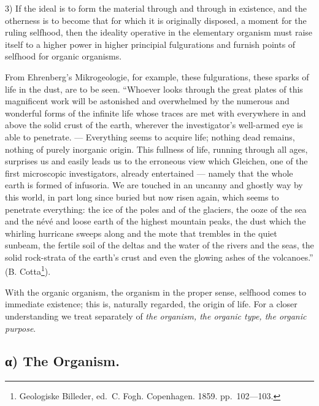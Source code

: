 \documentclass[12pt,a4paper]{book}
\begin{document}
3) If the ideal is to form the material through and through in existence, and
the otherness is to become that for which it is originally disposed, a moment
for the ruling selfhood,
\setcounter{footnote}{0}
then the ideality operative in the elementary organism must raise itself to a
higher power in higher principial fulgurations and furnish points of selfhood
for organic organisms.

From Ehrenberg's Mikrogeologie, for example, these fulgurations, these sparks
of life in the dust, are to be seen. ``Whoever looks through the great plates
of this magnificent work will be astonished and overwhelmed by the numerous and
wonderful forms of the infinite life whose traces are met with everywhere in
and above the solid crust of the earth, wherever the investigator's
well-armed eye is able to penetrate. --- Everything seems to acquire life;
nothing dead remains, nothing of purely inorganic origin. This fullness of
life, running through all ages, surprises us and easily leads us to the
erroneous view which Gleichen, one of the first microscopic investigators,
already entertained --- namely that the whole earth is formed of infusoria. We
are touched in an uncanny and ghostly way by this world, in part long since
buried but now risen again, which seems to penetrate everything: the ice of the
poles and of the glaciers, the ooze of the sea and the névé and loose earth of
the highest mountain peaks, the dust which the whirling hurricane sweeps along
and the mote that trembles in the quiet sunbeam, the fertile soil of the deltas
and the water of the rivers and the seas, the solid rock-strata of the earth's
crust and even the glowing ashes of the volcanoes.'' (B. Cotta\footnote{Geologiske
Billeder, ed.\ C. Fogh. Copenhagen. 1859. pp.~102---103.}).

With the organic organism, the organism in the proper sense, selfhood comes to
immediate existence; this is, naturally regarded, the origin of life. For a
closer understanding we treat separately of \emph{the organism, the organic
type, the organic purpose}.

\subsection*{α) The Organism.}
\end{document}
